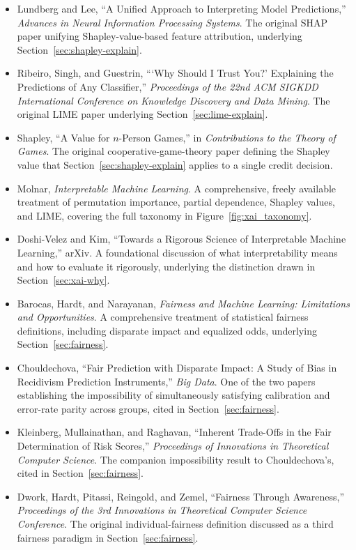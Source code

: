 \documentclass[../ai_in_finance]{subfiles}
\begin{document}
\begin{itemize}
    \item Lundberg and Lee, ``A Unified Approach to Interpreting Model Predictions,'' \emph{Advances in Neural Information Processing Systems}. The original SHAP paper unifying Shapley-value-based feature attribution, underlying Section~\ref{sec:shapley-explain}.
    \item Ribeiro, Singh, and Guestrin, ```Why Should I Trust You?' Explaining the Predictions of Any Classifier,'' \emph{Proceedings of the 22nd ACM SIGKDD International Conference on Knowledge Discovery and Data Mining}. The original LIME paper underlying Section~\ref{sec:lime-explain}.
    \item Shapley, ``A Value for $n$-Person Games,'' in \emph{Contributions to the Theory of Games}. The original cooperative-game-theory paper defining the Shapley value that Section~\ref{sec:shapley-explain} applies to a single credit decision.
    \item Molnar, \emph{Interpretable Machine Learning}. A comprehensive, freely available treatment of permutation importance, partial dependence, Shapley values, and LIME, covering the full taxonomy in Figure~\ref{fig:xai_taxonomy}.
    \item Doshi-Velez and Kim, ``Towards a Rigorous Science of Interpretable Machine Learning,'' arXiv. A foundational discussion of what interpretability means and how to evaluate it rigorously, underlying the distinction drawn in Section~\ref{sec:xai-why}.
    \item Barocas, Hardt, and Narayanan, \emph{Fairness and Machine Learning: Limitations and Opportunities}. A comprehensive treatment of statistical fairness definitions, including disparate impact and equalized odds, underlying Section~\ref{sec:fairness}.
    \item Chouldechova, ``Fair Prediction with Disparate Impact: A Study of Bias in Recidivism Prediction Instruments,'' \emph{Big Data}. One of the two papers establishing the impossibility of simultaneously satisfying calibration and error-rate parity across groups, cited in Section~\ref{sec:fairness}.
    \item Kleinberg, Mullainathan, and Raghavan, ``Inherent Trade-Offs in the Fair Determination of Risk Scores,'' \emph{Proceedings of Innovations in Theoretical Computer Science}. The companion impossibility result to Chouldechova's, cited in Section~\ref{sec:fairness}.
    \item Dwork, Hardt, Pitassi, Reingold, and Zemel, ``Fairness Through Awareness,'' \emph{Proceedings of the 3rd Innovations in Theoretical Computer Science Conference}. The original individual-fairness definition discussed as a third fairness paradigm in Section~\ref{sec:fairness}.

\end{itemize}
\end{document}
